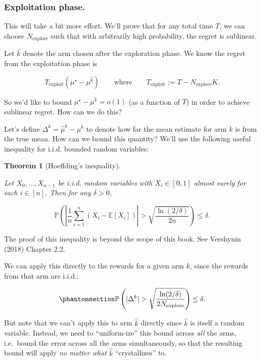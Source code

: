 \documentclass[
  letterpaper,
  DIV=11,
  numbers=noendperiod]{scrreprt}
\theoremstyle{plain}
\theoremstyle{plain}
\newtheorem{theorem}{Theorem}[chapter]
\theoremstyle{definition}
\theoremstyle{definition}
\theoremstyle{remark}
\begin{document}
\subsubsection{Exploitation phase.}\label{exploitation-phase.}

This will take a bit more effort. We'll prove that for any total time
\(T\), we can choose \(N_{\text{explore}}\) such that with arbitrarily
high probability, the regret is sublinear.

Let \(\hat k\) denote the arm chosen after the exploration phase. We
know the regret from the exploitation phase is

\[T_{\text{exploit}} (\mu^\star - \mu^{\hat k}) \qquad \text{where} \qquad T_{\text{exploit}} := T - N_{\text{explore}}K.\]

So we'd like to bound \(\mu^\star - \mu^{\hat k} = o(1)\) (as a function
of \(T\)) in order to achieve sublinear regret. How can we do this?

Let's define \(\Delta^k = \hat \mu^k - \mu^k\) to denote how far the
mean estimate for arm \(k\) is from the true mean. How can we bound this
quantity? We'll use the following useful inequality for i.i.d. bounded
random variables:

\begin{theorem}[Hoeffding's
inequality]\protect\hypertarget{thm-hoeffding}{}\label{thm-hoeffding}

Let \(X_0, \dots, X_{n-1}\) be i.i.d. random variables with
\(X_i \in [0, 1]\) almost surely for each \(i \in [n]\). Then for any
\(\delta > 0\),

\[\mathbb{P}\left( \left| \frac{1}{n} \sum_{i=1}^n (X_i - \mathbb{E}[X_i]) \right| > \sqrt{\frac{\ln(2/\delta)}{2n}} \right) \le \delta.\]

\end{theorem}

The proof of this inequality is beyond the scope of this book. See
Vershynin (2018) Chapter 2.2.

We can apply this directly to the rewards for a given arm \(k\), since
the rewards from that arm are i.i.d.:

\begin{equation}\phantomsection\label{eq-hoeffding-etc}{
\mathbb{P}\left(|\Delta^k | > \sqrt{\frac{\ln(2/\delta)}{2N_{\text{explore}}}} \right) \le \delta.
}\end{equation}

But note that we can't apply this to arm \(\hat k\) directly since
\(\hat k\) is itself a random variable. Instead, we need to
``uniform-ize'' this bound across \emph{all} the arms, i.e.~bound the
error across all the arms simultaneously, so that the resulting bound
will apply \emph{no matter what} \(\hat k\) ``crystallizes'' to.
\end{document}
